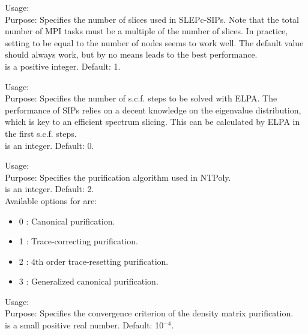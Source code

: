 {
  \noindent
  Usage:   \\[1.0ex]
  Purpose: Specifies the number of slices used in SLEPc-SIPs. Note that the
    total number of MPI tasks must be a multiple of the number of slices. In
    practice, setting  to be equal to the number of nodes seems
    to work well. The default value should always work, but by no means leads to
    the best performance. \\[1.0ex]
   is a positive integer. Default: 1. \\
}

{
  \noindent
  Usage:   \\[1.0ex]
  Purpose: Specifies the number of s.c.f. steps to be solved with ELPA. The
    performance of SIPs relies on a decent knowledge on the eigenvalue
    distribution, which is key to an efficient spectrum slicing. This can be
    calculated by ELPA in the first  s.c.f. steps. \\[1.0ex]
   is an integer. Default: 0. \\
}

{
  \noindent
  Usage:   \\[1.0ex]
  Purpose: Specifies the purification algorithm used in NTPoly. \\[1.0ex]
   is an integer. Default: 2. \\
}
Available options for  are:
\begin{itemize}
  \item 0 : Canonical purification.
  \item 1 : Trace-correcting purification.
  \item 2 : 4th order trace-resetting purification.
  \item 3 : Generalized canonical purification.
\end{itemize}

{
  \noindent
  Usage:   \\[1.0ex]
  Purpose: Specifies the convergence criterion of the density matrix
    purification. \\[1.0ex]
   is a small positive real number. Default: 10$^{-4}$. \\
}

